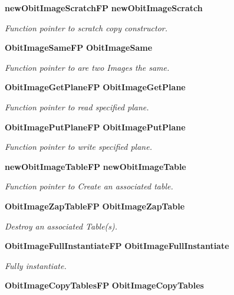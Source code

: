 \begin{CompactItemize}
{\bf new\-Obit\-Image\-Scratch\-FP} {\bf new\-Obit\-Image\-Scratch}
\begin{CompactList}\small\item\em Function pointer to scratch copy constructor. \item\end{CompactList}\item 
{\bf Obit\-Image\-Same\-FP} {\bf Obit\-Image\-Same}
\begin{CompactList}\small\item\em Function pointer to are two Images the same. \item\end{CompactList}\item 
{\bf Obit\-Image\-Get\-Plane\-FP} {\bf Obit\-Image\-Get\-Plane}
\begin{CompactList}\small\item\em Function pointer to read specified plane. \item\end{CompactList}\item 
{\bf Obit\-Image\-Put\-Plane\-FP} {\bf Obit\-Image\-Put\-Plane}
\begin{CompactList}\small\item\em Function pointer to write specified plane. \item\end{CompactList}\item 
{\bf new\-Obit\-Image\-Table\-FP} {\bf new\-Obit\-Image\-Table}
\begin{CompactList}\small\item\em Function pointer to Create an associated table. \item\end{CompactList}\item 
{\bf Obit\-Image\-Zap\-Table\-FP} {\bf Obit\-Image\-Zap\-Table}
\begin{CompactList}\small\item\em Destroy an associated Table(s). \item\end{CompactList}\item 
{\bf Obit\-Image\-Full\-Instantiate\-FP} {\bf Obit\-Image\-Full\-Instantiate}
\begin{CompactList}\small\item\em Fully instantiate. \item\end{CompactList}\item 
{\bf Obit\-Image\-Copy\-Tables\-FP} {\bf Obit\-Image\-Copy\-Tables}

\end{CompactItemize}
